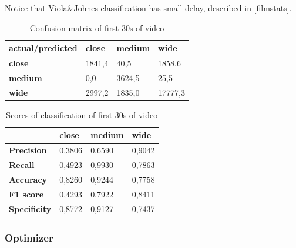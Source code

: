 \documentclass[english]{article}
\begin{document}
		Notice that Viola\&Johnes classification has small delay, described in \ref{filmstats}.

		\begin{table}[H]
			\centering
			\begin{tabular}{|l|l|l|l|}
				\hline
				\textbf{actual/predicted} & \textbf{close} & \textbf{medium} & \textbf{wide} \\ \hline
				\textbf{close}            & 1841,4         & 40,5            & 1858,6        \\ \hline
				\textbf{medium}           & 0,0            & 3624,5          & 25,5          \\ \hline
				\textbf{wide}             & 2997,2         & 1835,0          & 17777,3       \\ \hline
			\end{tabular}
			\caption{Confusion matrix of first 30s of video \cite{marvel}}
			\label{fig:marvel_confusion}
		\end{table}


		\begin{table}[H]
			\centering
			\begin{tabular}{|l|l|l|l|}
				\hline
				\textbf{}            & \textbf{close} & \textbf{medium} & \textbf{wide} \\ \hline
				\textbf{Precision}   & 0,3806         & 0,6590          & 0,9042        \\ \hline
				\textbf{Recall}      & 0,4923         & 0,9930          & 0,7863        \\ \hline
				\textbf{Accuracy}    & 0,8260         & 0,9244          & 0,7758        \\ \hline
				\textbf{F1 score}    & 0,4293         & 0,7922          & 0,8411        \\ \hline
				\textbf{Specificity} & 0,8772         & 0,9127          & 0,7437        \\ \hline
			\end{tabular}
			\caption{Scores of classification of first 30s of video \cite{marvel}}
			\label{fig:marvel_stats}
		\end{table}

	\subsubsection{Optimizer}
\end{document}

